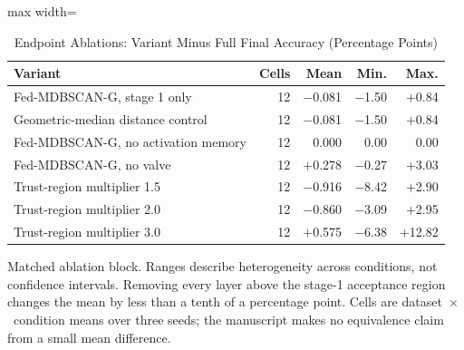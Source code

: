 \begin{table}[!t]
\centering\footnotesize
\setlength{\tabcolsep}{4pt}
\caption{Endpoint Ablations: Variant Minus Full Final Accuracy (Percentage Points)}\label{tab:ablation}
\begin{adjustbox}{max width=\columnwidth}
\begin{tabular}{lrrrr}
\toprule
Variant & Cells & Mean & Min. & Max. \\
\midrule
Fed-MDBSCAN-G, stage 1 only & 12 & $-$0.081 & $-$1.50 & $+$0.84 \\
Geometric-median distance control & 12 & $-$0.081 & $-$1.50 & $+$0.84 \\
Fed-MDBSCAN-G, no activation memory & 12 & 0.000 & 0.00 & 0.00 \\
Fed-MDBSCAN-G, no valve & 12 & $+$0.278 & $-$0.27 & $+$3.03 \\
Trust-region multiplier 1.5 & 12 & $-$0.916 & $-$8.42 & $+$2.90 \\
Trust-region multiplier 2.0 & 12 & $-$0.860 & $-$3.09 & $+$2.95 \\
Trust-region multiplier 3.0 & 12 & $+$0.575 & $-$6.38 & $+$12.82 \\
\bottomrule
\end{tabular}
\end{adjustbox}

\par\vspace{3pt}\parbox{\linewidth}{\footnotesize Matched ablation block. Ranges describe heterogeneity across conditions, not confidence intervals. Removing every layer above the stage-1 acceptance region changes the mean by less than a tenth of a percentage point. Cells are dataset~$\times$~condition means over three seeds; the manuscript makes no equivalence claim from a small mean difference.}
\end{table}
